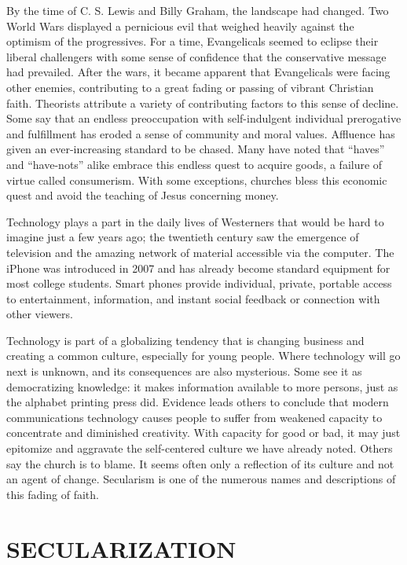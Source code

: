By the time of C. S. Lewis and Billy Graham, the landscape had changed. Two World Wars displayed a
pernicious evil that weighed heavily against the optimism of the progressives. For a time,
Evangelicals seemed to eclipse their liberal challengers with some sense of confidence that the
conservative message had prevailed. After the wars, it became apparent that Evangelicals were facing
other enemies, contributing to a great fading or passing of vibrant Christian faith. Theorists
attribute a variety of contributing factors to this sense of decline. Some say that an endless
preoccupation with self-indulgent individual prerogative and fulfillment has eroded a sense of
community and moral values. Affluence has given an ever-increasing standard to be chased. Many have
noted that “haves” and “have-nots” alike embrace this endless quest to acquire goods, a failure of
virtue called consumerism. With some exceptions, churches bless this economic quest and avoid the
teaching of Jesus concerning money.

Technology plays a part in the daily lives of Westerners that would be hard to imagine just a few
years ago; the twentieth century saw the emergence of television and the amazing network of material
accessible via the computer. The iPhone was introduced in 2007 and has already become standard
equipment for most college students. Smart phones provide individual, private, portable access to
entertainment, information, and instant social feedback or connection with other viewers.

Technology is part of a globalizing tendency that is changing business and creating a common
culture, especially for young people. Where technology will go next is unknown, and its consequences
are also mysterious. Some see it as democratizing knowledge: it makes information available to more
persons, just as the alphabet printing press did. Evidence leads others to conclude that modern
communications technology causes people to suffer from weakened capacity to concentrate and
diminished creativity. With capacity for good or bad, it may just epitomize and aggravate the
self-centered culture we have already noted. Others say the church is to blame. It seems often only
a reflection of its culture and not an agent of change. Secularism is one of the numerous names and
descriptions of this fading of faith.

\section{SECULARIZATION}

